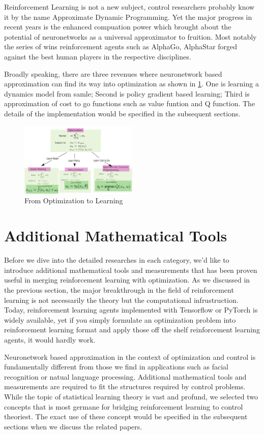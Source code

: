 \documentclass[journal]{IEEEtran}
\begin{document}
Reinforcement Learning is not a new subject, control researchers probably know it by the name Approximate Dynamic Programming. Yet the major progress in recent years is the enhanced compuation power which brought about the potential of neuronetworks as a universal approximator \cite{Hornik1991ApproximationCO} to fruition. Most notably the series of wins reinforcement agents such as AlphaGo, AlphaStar forged against the best human players in the respective disciplines.

Broadly speaking, there are three revenues where neuronetwork based approximation can find its way into optimization as shown in \ref{fig:1}. One is learning a dynamics model from samle; Second is policy gradient based learning; Third is approximation of cost to go functions such as value funtion and Q function. The details of the implementation would be specified in the subsequent sections.

\begin{figure}[H]
    \centering
    \includegraphics[width=0.5\textwidth]{Control.png}
    \caption{From Optimization to Learning}
    \label{fig:1}
\end{figure}

\section{Additional Mathematical Tools}
Before we dive into the detailed researches in each category, we'd like to introduce additional mathematical tools and measurements that has been proven useful in merging reinforcement learning with optimization. As we discussed in the previous section, the major breakthrough in the field of reinforcement learning is not necessarily the theory but the computational infrustruction. Today, reinforcement learning agents implemented with Tensorflow or PyTorch is widely available, yet if you simply formulate an optimization problem into reinforcement learning format and apply those off the shelf reinforcement learning agents, it would hardly work.

Neuronetwork based approximation in the context of optimization and control is fundamentally different from those we find in applications such as facial recognition or natual language processing. Additional mathematical tools and measurements are required to fit the structures required by control problems. While the topic of statistical learning theory is vast and profund, we selected two concepts that is most germane for bridging reinforcement learning to control theoriest. The exact use of these concept would be specified in the subsequent sections when we discuss the related papers.
\end{document}
